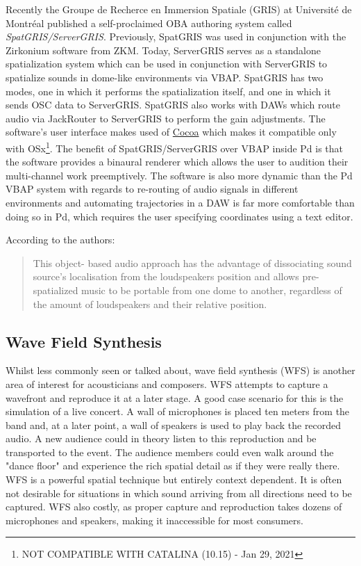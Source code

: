 Recently the Groupe de Recherce en Immersion Spatiale (GRIS) at Université de Montréal published a self-proclaimed OBA authoring system called \textit{SpatGRIS/ServerGRIS}. Previously, SpatGRIS was used in conjunction with the Zirkonium software from ZKM. Today, ServerGRIS serves as a standalone spatialization system which can be used in conjunction with ServerGRIS to spatialize sounds in dome-like environments via VBAP. SpatGRIS has two modes, one in which it performs the spatialization itself, and one in which it sends OSC data to ServerGRIS. SpatGRIS also works with DAWs which route audio via JackRouter to ServerGRIS to perform the gain adjustments. The software's user interface makes used of \href{https://en.wikipedia.org/wiki/Cocoa_(API)}{Cocoa} which makes it compatible only with OSx\footnote{NOT COMPATIBLE WITH CATALINA (10.15) - Jan 29, 2021}. The benefit of SpatGRIS/ServerGRIS over VBAP inside Pd is that the software provides a binaural renderer which allows the user to audition their multi-channel work preemptively. The software is also more dynamic than the Pd VBAP system with regards to re-routing of audio signals in different environments and automating trajectories in a DAW is far more comfortable than doing so in Pd, which requires the user specifying coordinates using a text editor. 


According to the authors:

\begin{quote}
    This object- based audio approach has the advantage of dissociating sound source’s localisation from the loudspeakers position and allows pre-spatialized music to be portable from one dome to another, regardless of the amount of loudspeakers and their relative position. \cite{ledoux2018immersive}
\end{quote}




\subsection{Wave Field Synthesis}
\label{subsec:wfs}

Whilst less commonly seen or talked about, wave field synthesis (WFS) is another area of interest for acousticians and composers. WFS attempts to capture a wavefront and reproduce it at a later stage. A good case scenario for this is the simulation of a live concert. A wall of microphones is placed ten meters from the band and, at a later point, a wall of speakers is used to play back the recorded audio. A new audience could in theory listen to this reproduction and be transported to the event. The audience members could even walk around the "dance floor" and experience the rich spatial detail as if they were really there. WFS is a powerful spatial technique but entirely context dependent. It is often not desirable for situations in which sound arriving from all directions need to be captured. WFS also costly, as proper capture and reproduction takes dozens of microphones and speakers, making it inaccessible for most consumers.

